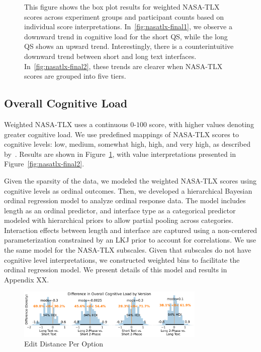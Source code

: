 \begin{figure}[htbp]
    \caption{This figure shows the box plot results for weighted NASA-TLX scores across experiment groups and participant counts based on individual score interpretations. In~\ref{fig:nasatlx-final1}, we observe a downward trend in cognitive load for the short QS, while the long QS shows an upward trend. Interestingly, there is a counterintuitive downward trend between short and long text interfaces. In~\ref{fig:nasatlx-final2}, these trends are clearer when NASA-TLX scores are grouped into five tiers.}
    \label{fig:nasatlx-final}
\end{figure}

\subsection{Overall Cognitive Load}
\label{sec:cog_overall}
Weighted NASA-TLX uses a continuous $0$-$100$ score, with higher values denoting greater cognitive load. We use predefined mappings of NASA-TLX scores to cognitive levels: low, medium, somewhat high, high, and very high, as described by~\textcite{hart1988development}. Results are shown in Figure~\ref{fig:nasatlx-final}, with value interpretations presented in Figure~\ref{fig:nasatlx-final2}.

Given the sparsity of the data, we modeled the weighted NASA-TLX scores using cognitive levels as ordinal outcomes. Then, we developed a hierarchical Bayesian ordinal regression model to analyze ordinal response data. The model includes length as an ordinal predictor, and interface type as a categorical predictor modeled with hierarchical priors to allow partial pooling across categories. Interaction effects between length and interface are captured using a non-centered parameterization constrained by an LKJ prior to account for correlations. We use the same model for the NASA-TLX subscales. Given that subscales do not have cognitive level interpretations, we constructed weighted bins to facilitate the ordinal regression model. We present details of this model and results in Appendix XX.

\begin{figure}[h]
    \centering
    \includegraphics[width=0.8\textwidth]{content/image/cog/weighted_cog_version_single_row.pdf}
    \caption{Edit Distance Per Option}
    \label{fig:weighted_cog_version}
\end{figure}

